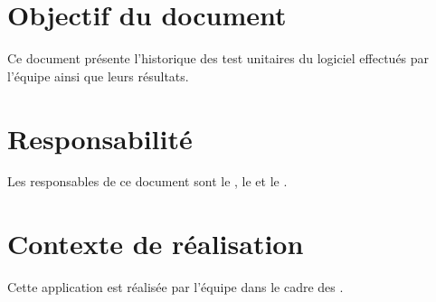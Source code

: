 \section*{Objectif du document}
	Ce document présente l'historique des test unitaires du logiciel effectués par l'équipe \nomEquipe{} ainsi que leurs résultats.	
	
\section*{Responsabilité}
	Les responsables de ce document sont le \CP, le \RQ{} et le \RD.
	
\section*{Contexte de réalisation}
	Cette application est réalisée par l'équipe \nomEquipe{} dans le cadre des \PIC.

